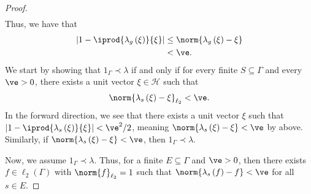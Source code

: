 \documentclass[10pt]{mypackage}
\begin{document}
\begin{proof}
\begin{align*}
  \end{align*}
  Thus, we have that
  \begin{align*}
    \left\vert 1- \iprod{\lambda_g\left(\xi\right)}{\xi} \right\vert &\leq \norm{ \lambda_g\left(\xi\right) - \xi }\\
                                                                     &< \ve.
  \end{align*}
%
  We start by showing that $1_{\Gamma}\prec \lambda$ if and only if for every finite $S\subseteq \Gamma$ and every $\ve > 0$, there exists a unit vector $\xi\in \mathcal{H}$ such that
  \begin{align*}
    \norm{\lambda_s\left(\xi\right) - \xi}_{\ell_2} < \ve.
  \end{align*}
  In the forward direction, we see that there exists a unit vector $\xi$ such that $\left\vert 1 - \iprod{\lambda_s\left(\xi\right)}{\xi} \right\vert < \ve^2/2$, meaning $\norm{\lambda_s\left(\xi\right) - \xi} < \ve$ by above. Similarly, if $\norm{\lambda_s\left(\xi\right)-\xi} < \ve$, then $1_{\Gamma}\prec \lambda$.\newline

  Now, we assume $1_{\Gamma} \prec \lambda$. Thus, for a finite $E\subseteq \Gamma$ and $\ve > 0$, then there exists $f\in \ell_2\left(\Gamma\right)$ with $\norm{f}_{\ell_2} = 1$ such that $\norm{\lambda_s\left(f\right) - f} < \ve$ for all $s\in E$.\newline


\end{proof}
\end{document}
